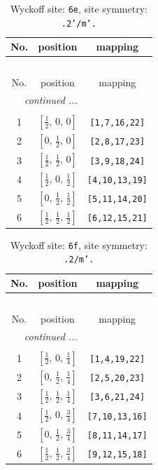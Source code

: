 \documentclass[fleqn,8pt]{jsarticle}
\begin{document}
\renewcommand{\arraystretch}{1.2}
\begin{longtable}{ccc}
\caption{Wyckoff site: {\tt 6e}, site symmetry: {\tt .2'/m'.}}
 \\
 \hline \hline
No. & position & mapping \\ \hline \endfirsthead

\multicolumn{2}{l}{\tablename\ \thetable{}} \\
 \hline \hline
No. & position & mapping \\ \hline \endhead

 \hline \hline
\multicolumn{2}{r}{\footnotesize\it continued ...} \\ \endfoot

 \hline \hline
\multicolumn{2}{r}{} \\ \endlastfoot

1 & $\left[ \frac{1}{2},\, 0,\, 0 \right]$ & {\tt [1,7,16,22]} \\ \hline
2 & $\left[ 0,\, \frac{1}{2},\, 0 \right]$ & {\tt [2,8,17,23]} \\ \hline
3 & $\left[ \frac{1}{2},\, \frac{1}{2},\, 0 \right]$ & {\tt [3,9,18,24]} \\ \hline
4 & $\left[ \frac{1}{2},\, 0,\, \frac{1}{2} \right]$ & {\tt [4,10,13,19]} \\ \hline
5 & $\left[ 0,\, \frac{1}{2},\, \frac{1}{2} \right]$ & {\tt [5,11,14,20]} \\ \hline
6 & $\left[ \frac{1}{2},\, \frac{1}{2},\, \frac{1}{2} \right]$ & {\tt [6,12,15,21]} \\
\end{longtable}
\renewcommand{\arraystretch}{1.2}
\begin{longtable}{ccc}
\caption{Wyckoff site: {\tt 6f}, site symmetry: {\tt .2/m'.}}
 \\
 \hline \hline
No. & position & mapping \\ \hline \endfirsthead

\multicolumn{2}{l}{\tablename\ \thetable{}} \\
 \hline \hline
No. & position & mapping \\ \hline \endhead

 \hline \hline
\multicolumn{2}{r}{\footnotesize\it continued ...} \\ \endfoot

 \hline \hline
\multicolumn{2}{r}{} \\ \endlastfoot

1 & $\left[ \frac{1}{2},\, 0,\, \frac{1}{4} \right]$ & {\tt [1,4,19,22]} \\ \hline
2 & $\left[ 0,\, \frac{1}{2},\, \frac{1}{4} \right]$ & {\tt [2,5,20,23]} \\ \hline
3 & $\left[ \frac{1}{2},\, \frac{1}{2},\, \frac{1}{4} \right]$ & {\tt [3,6,21,24]} \\ \hline
4 & $\left[ \frac{1}{2},\, 0,\, \frac{3}{4} \right]$ & {\tt [7,10,13,16]} \\ \hline
5 & $\left[ 0,\, \frac{1}{2},\, \frac{3}{4} \right]$ & {\tt [8,11,14,17]} \\ \hline
6 & $\left[ \frac{1}{2},\, \frac{1}{2},\, \frac{3}{4} \right]$ & {\tt [9,12,15,18]} \\
\end{longtable}
\end{document}
